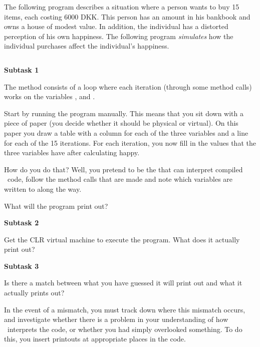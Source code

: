 The following program describes a situation where a person wants to buy 15 items, each costing 6000 DKK. This person has an amount in his bankbook and owns a house of modest value. In addition, the individual has a distorted perception of his own happiness. The following program \textsl{simulates} how the individual purchases affect the individual's happiness.

\inputminted{csharp}{\context/question/Happiness.cs}

\textbf{Subtask 1}

The  method consists of a loop where each iteration (through some method calls) works on the variables ,  and .

Start by running the program manually. This means that you sit down with a piece of paper (you decide whether it should be physical or virtual). On this paper you draw a table with a column for each of the three variables and a line for each of the 15 iterations. For each iteration, you now fill in the values ​​that the three variables have after calculating happy.

How do you do that? Well, you pretend to be the   that can interpret compiled \csharp\ code, follow the method calls that are made and note which variables are written to along the way.

What will the program print out?

\textbf{Subtask 2}

Get the CLR virtual machine to execute the program. What does it actually print out?

\textbf{Subtask 3}

Is there a match between what you have guessed it will print out and what it actually prints out?

In the event of a mismatch, you must track down where this mismatch occurs, and investigate whether there is a problem in your understanding of how \csharp\ interprets the code, or whether you had simply overlooked something. To do this, you insert printouts at appropriate places in the code.
